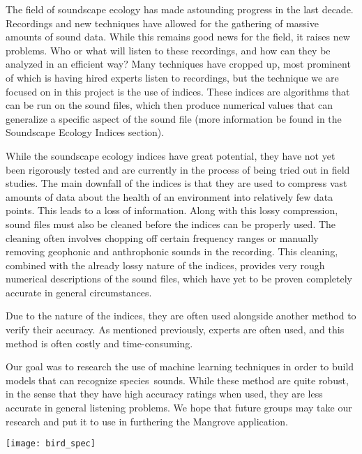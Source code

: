 The field of soundscape ecology has made astounding progress in the last decade.
Recordings and new techniques have allowed for the gathering of massive amounts of sound data. While this remains good news for the field, it raises new problems. Who or what will listen to these recordings, and how can they be analyzed in an efficient way? Many techniques have cropped up, most prominent of which is having hired experts listen to recordings, but the technique we are focused on in this project is the use of indices. These indices are algorithms that can be run on the sound files, which then produce numerical values that can generalize a specific aspect of the sound file (more information be found in the Soundscape Ecology Indices section).\par
While the soundscape ecology indices have great potential, they have not yet been rigorously tested and are currently in the process of being tried out in field studies. The main downfall of the indices is that they are used to compress vast amounts of data about the health of an environment into relatively few data points. This leads to a loss of information. Along with this lossy compression, sound files must also be cleaned before the indices can be properly used. The cleaning often involves chopping off certain frequency ranges or manually removing geophonic and anthrophonic sounds in the recording. This cleaning, combined with the already lossy nature of the indices, provides very rough numerical descriptions of the sound files, which have yet to be proven completely accurate in general circumstances.\par
Due to the nature of the indices, they are often used alongside another method to verify their accuracy. As mentioned previously, experts are often used, and this method is often costly and time-consuming.\par
Our goal was to research the use of machine learning techniques in order to build models that can recognize species\textquotesingle\ sounds. While these method are quite robust, in the sense that they have high accuracy ratings when used, they are less accurate in general listening problems. We hope that future groups may take our research and put it to use in furthering the Mangrove application.\par
\begin{center}
	\texttt{[image: bird\_spec]}
\end{center}
